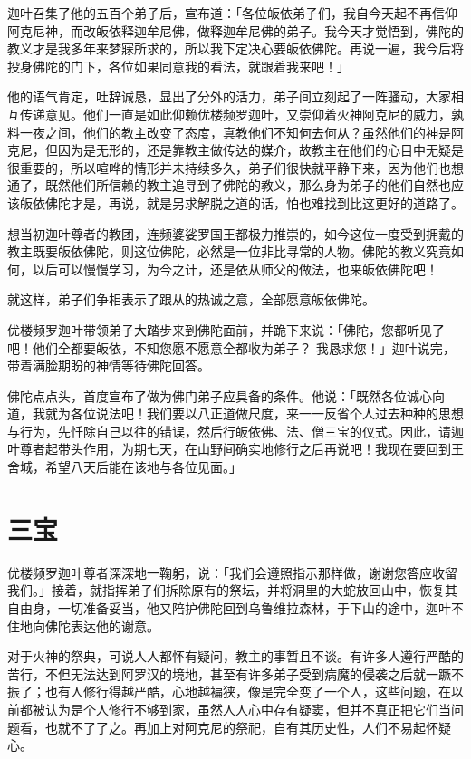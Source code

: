 \documentclass[twoside,openany]{book}
\begin{document}
迦叶召集了他的五百个弟子后，宣布道：「各位皈依弟子们，我自今天起不再信仰阿克尼神，而改皈依释迦牟尼佛，做释迦牟尼佛的弟子。我今天才觉悟到，佛陀的教义才是我多年来梦寐所求的，所以我下定决心要皈依佛陀。再说一遍，我今后将投身佛陀的门下，各位如果同意我的看法，就跟着我来吧！」

他的语气肯定，吐辞诚恳，显出了分外的活力，弟子间立刻起了一阵骚动，大家相互传递意见。他们一直是如此仰赖优楼频罗迦叶，又崇仰着火神阿克尼的威力，孰料一夜之间，他们的教主改变了态度，真教他们不知何去何从？虽然他们的神是阿克尼，但因为是无形的，还是靠教主做传达的媒介，故教主在他们的心目中无疑是很重要的，所以喧哗的情形并未持续多久，弟子们很快就平静下来，因为他们也想通了，既然他们所信赖的教主追寻到了佛陀的教义，那么身为弟子的他们自然也应该皈依佛陀才是，再说，就是另求解脱之道的话，怕也难找到比这更好的道路了。

想当初迦叶尊者的教团，连频婆娑罗国王都极力推崇的，如今这位一度受到拥戴的教主既要皈依佛陀，则这位佛陀，必然是一位非比寻常的人物。佛陀的教义究竟如何，以后可以慢慢学习，为今之计，还是依从师父的做法，也来皈依佛陀吧！

就这样，弟子们争相表示了跟从的热诚之意，全部愿意皈依佛陀。

优楼频罗迦叶带领弟子大踏步来到佛陀面前，并跪下来说：「佛陀，您都听见了吧！他们全都要皈依，不知您愿不愿意全都收为弟子？	我恳求您！」迦叶说完，带着满脸期盼的神情等待佛陀回答。

佛陀点点头，首度宣布了做为佛门弟子应具备的条件。他说：「既然各位诚心向道，我就为各位说法吧！我们要以八正道做尺度，来一一反省个人过去种种的思想与行为，先忏除自己以往的错误，然后行皈依佛、法、僧三宝的仪式。因此，请迦叶尊者起带头作用，为期七天，在山野间确实地修行之后再说吧！我现在要回到王舍城，希望八天后能在该地与各位见面。」

\section{三宝}\label{sec3.6}

优楼频罗迦叶尊者深深地一鞠躬，说：「我们会遵照指示那样做，谢谢您答应收留我们。」接着，就指挥弟子们拆除原有的祭坛，并将洞里的大蛇放回山中，恢复其自由身，一切准备妥当，他又陪护佛陀回到乌鲁维拉森林，于下山的途中，迦叶不住地向佛陀表达他的谢意。

对于火神的祭典，可说人人都怀有疑问，教主的事暂且不谈。有许多人遵行严酷的苦行，不但无法达到阿罗汉的境地，甚至有许多弟子受到病魔的侵袭之后就一蹶不振了；也有人修行得越严酷，心地越褊狭，像是完全变了一个人，这些问题，在以前都被认为是个人修行不够到家，虽然人人心中存有疑窦，但并不真正把它们当问题看，也就不了了之。再加上对阿克尼的祭祀，自有其历史性，人们不易起怀疑心。
\end{document}
